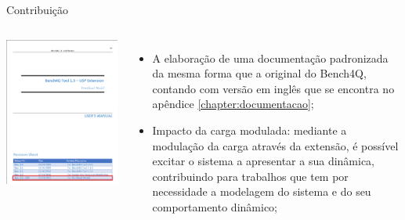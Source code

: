 \begin{frame}{Contribuição}
	\begin{columns}
		\begin{minipage}[c][0.4\textheight][c]{\linewidth}
			\centering
			\includegraphics[width=1\linewidth]{images/capa-documentacao.png}
			\label{fig:documentacao}	
		\end{minipage}
		\begin{minipage}[c][0.4\textheight][c]{\linewidth}
			\begin{itemize}
				\item A elaboração de uma documentação padronizada da mesma forma que a original do Bench4Q, contando com versão em inglês que se encontra no apêndice \ref{chapter:documentacao};
				
				\item Impacto da carga modulada: mediante a modulação da carga através da extensão, é possível excitar o sistema a apresentar a sua dinâmica, contribuindo para trabalhos que tem por necessidade a modelagem do sistema e do seu comportamento dinâmico;
			\end{itemize} 
		\end{minipage}		
	\end{columns}	
\end{frame}

